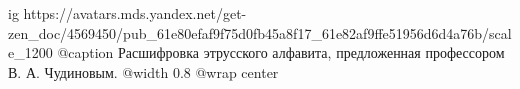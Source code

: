  
 
 
 
 

\ifcmt
  ig https://avatars.mds.yandex.net/get-zen_doc/4569450/pub_61e80efaf9f75d0fb45a8f17_61e82af9ffe51956d6d4a76b/scale_1200
  @caption Расшифровка этрусского алфавита, предложенная профессором В. А. Чудиновым.
	@width 0.8
	@wrap center
\fi
